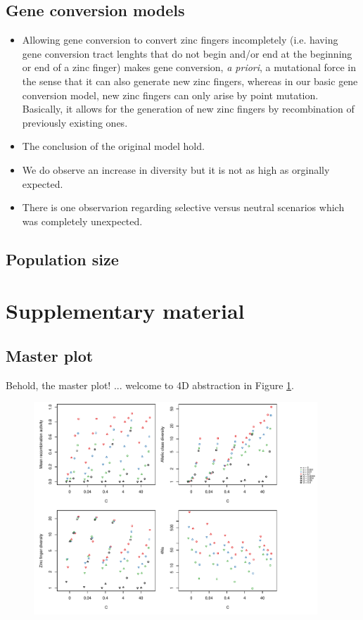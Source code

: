 \documentclass[a4paper,10pt]{article}
\begin{document}
\subsection{Gene conversion models}
\begin{itemize}
\item Allowing gene conversion to convert zinc fingers incompletely (i.e. having gene conversion tract lenghts that do not begin and/or end at the beginning or end of a zinc finger) makes gene conversion, \textit{a priori}, a mutational force in the sense that it can also generate new zinc fingers, whereas in our basic gene conversion model, new zinc fingers can only arise by point mutation. Basically, it allows for the generation of new zinc fingers by recombination of previously existing ones. 
\item The conclusion of the original model hold. 
\item We do observe an increase in diversity but it is not as high as orginally expected. 
\item There is one observarion regarding selective versus neutral scenarios which was completely unexpected. 
\end{itemize}

\subsection{Population size}
 




\section{Supplementary material}

\subsection{Master plot}

Behold, the master plot! 
... welcome to 4D abstraction in Figure \ref{RDZs_plot}.

\begin{figure}[htb]
\begin{center}
\leavevmode
\includegraphics[width=0.95\textwidth] {./Images/prdm9_RDZs_Nulls.pdf}
\end{center}
\caption{\small{}}
\label{RDZs_plot}
\end{figure}

%

\end{document}
